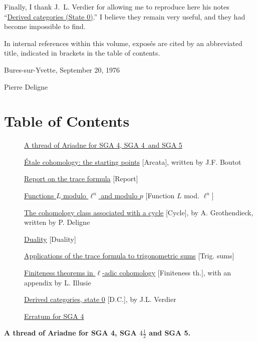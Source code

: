 Finally, I thank J.~L. Verdier for allowing me to reproduce here his notes
``\hyperref[VIII]{Derived categories (State 0)}.'' I believe they remain very useful, and they had become
impossible to find.

In internal references within this volume, expos\'es are cited by an
abbreviated title, indicated in brackets in the table of contents.

\vspace{20pt}
Bures-sur-Yvette, September 20, 1976

\vspace{5pt}
Pierre Deligne



\chapter*{Table of Contents}
\label{OriginalContents}
\begin{description}
\item[] \hyperref[Ariane]{A thread of Ariadne for SGA 4, SGA 4\textonehalf\ and SGA 5}
\item[] \hyperref[I]{Étale cohomology: the starting points} [Arcata], written by J.F. Boutot
\item[] \hyperref[II]{Report on the trace formula} [Report]
\item[] \hyperref[III]{Functions $L$ modulo $\ell^n$ and modulo $p$} [Function $L$ mod. $\ell^n$]
\item[] \hyperref[IV]{The cohomology class associated with a cycle} [Cycle], by A. Grothendieck, written by P. Deligne
\item[] \hyperref[V]{Duality} [Duality]
\item[] \hyperref[VI]{Applications of the trace formula to trigonometric sums} [Trig. sums]
\item[] \hyperref[VII]{Finiteness theorems in $\ell$-adic cohomology} [Finiteness th.], with an appendix by L. Illusie
\item[] \hyperref[VIII]{Derived categories, state 0} [D.C.], by J.L. Verdier
\item[] \hyperref[ErratumSGA4]{Erratum for SGA 4}
\end{description}
\clearpage


\markboth{}{}
\thispagestyle{plain}
{}
\begin{center}
\textbf{A thread of Ariadne for SGA 4, SGA $4\frac12$ and SGA 5.}
\end{center}
\label{Ariane}

